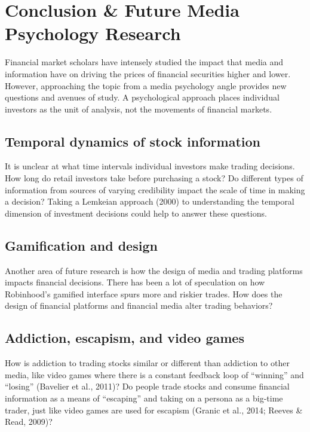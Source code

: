 \documentclass[12pt,]{article}
\begin{document}
\hypertarget{conclusion-future-media-psychology-research}{%
\section{Conclusion \& Future Media Psychology
Research}\label{conclusion-future-media-psychology-research}}

Financial market scholars have intensely studied the impact that media
and information have on driving the prices of financial securities
higher and lower. However, approaching the topic from a media psychology
angle provides new questions and avenues of study. A psychological
approach places individual investors as the unit of analysis, not the
movements of financial markets.

\hypertarget{temporal-dynamics-of-stock-information}{%
\subsection{Temporal dynamics of stock
information}\label{temporal-dynamics-of-stock-information}}

It is unclear at what time intervals individual investors make trading
decisions. How long do retail investors take before purchasing a stock?
Do different types of information from sources of varying credibility
impact the scale of time in making a decision? Taking a Lemkeian
approach (2000) to understanding the temporal dimension of investment
decisions could help to answer these questions.

\hypertarget{gamification-and-design}{%
\subsection{Gamification and design}\label{gamification-and-design}}

Another area of future research is how the design of media and trading
platforms impacts financial decisions. There has been a lot of
speculation on how Robinhood's gamified interface spurs more and riskier
trades. How does the design of financial platforms and financial media
alter trading behaviors?

\hypertarget{addiction-escapism-and-video-games}{%
\subsection{Addiction, escapism, and video
games}\label{addiction-escapism-and-video-games}}

How is addiction to trading stocks similar or different than addiction
to other media, like video games where there is a constant feedback loop
of ``winning'' and ``losing'' (Bavelier et al., 2011)? Do people trade
stocks and consume financial information as a means of ``escaping'' and
taking on a persona as a big-time trader, just like video games are used
for escapism (Granic et al., 2014; Reeves \& Read, 2009)?
\end{document}

